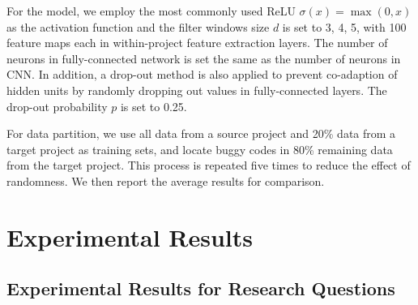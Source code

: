 For the \TRANPCNN model, we employ the most commonly used ReLU $\sigma(x)=\max(0,x)$ as the activation function and the filter windows size $d$ is set to 3, 4, 5, with 100 feature maps each in within-project feature extraction layers. The number of neurons in fully-connected network is set the same as the number of neurons in CNN. In addition, a drop-out method is also applied to prevent co-adaption of hidden units by randomly dropping out values in fully-connected layers. The drop-out probability $p$ is set to 0.25.

For data partition, we use all data from a source project and 20\% data from a target project as training sets, and locate buggy codes in 80\% remaining data from the target project. This process is repeated five times to reduce the effect of randomness. We then report the average results for comparison. 

\section{Experimental Results}

\subsection{Experimental Results for Research Questions}


